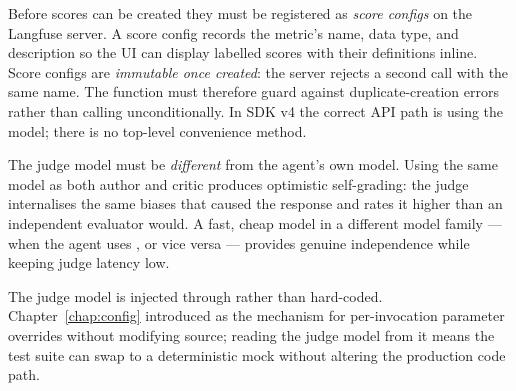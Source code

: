 Before scores can be created they must be registered as \emph{score
configs} on the Langfuse server.  A score config records the metric's name,
data type, and description so the UI can display labelled scores with
their definitions inline.  Score configs are \emph{immutable once created}:
the server rejects a second  call with the same name.  The
 function must therefore guard against
duplicate-creation errors rather than calling  unconditionally.
In SDK v4 the correct API path is
 using the
 model; there is no top-level convenience
method.

\begin{notebox}
The judge model must be \emph{different} from the agent's own model.
Using the same model as both author and critic produces optimistic
self-grading: the judge internalises the same biases that caused the
response and rates it higher than an independent evaluator would.
A fast, cheap model in a different model family --- 
when the agent uses , or vice versa --- provides
genuine independence while keeping judge latency low.
\end{notebox}

The judge model is injected through 
rather than hard-coded.  Chapter~\ref{chap:config} introduced
 as the mechanism for per-invocation
parameter overrides without modifying source; reading the judge model from
it means the test suite can swap to a deterministic mock without altering
the production code path.

